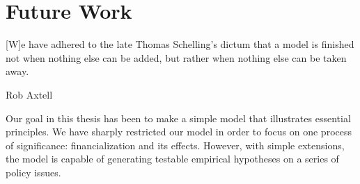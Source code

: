 \chapter[Future Work]{Future Work} \label{appendix-future-work}

\epigraph{[W]e have adhered to the late Thomas Schelling’s dictum that a model is finished not when nothing else can be added, but rather when nothing else can be taken away.}{Rob Axtell \cite{axtellDynamicsFirmsData2024}}


Our goal in this thesis has been to make a simple model that illustrates essential principles. %
We have sharply restricted our model in order to focus on one process of significance: financialization and its effects. However, with simple extensions, the model is capable of generating testable empirical hypotheses on a series of policy issues. 




